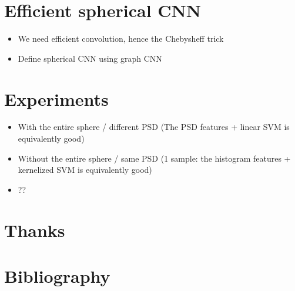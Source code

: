 \documentclass[preprint,12pt,authoryear]{elsarticle}
\newcommand{\assign}[1]{{\color[rgb]{.8,.5,.8}{Assigned: #1 }}}
\begin{document}
\section{Efficient spherical CNN}
\assign{Michael}


\begin{itemize}
	\item We need efficient convolution, hence the Chebysheff trick
	\item Define spherical CNN using graph CNN
\end{itemize}

\section{Experiments}
\assign{Nathanael, Tomek}

\begin{itemize}
	\item With the entire sphere / different PSD (The PSD features + linear SVM is equivalently good)
	\item Without the entire sphere / same PSD (1 sample: the histogram features + kernelized SVM is equivalently good)
	\item ??
\end{itemize}


\section*{Thanks}



\section*{Bibliography}
 

\end{document}
